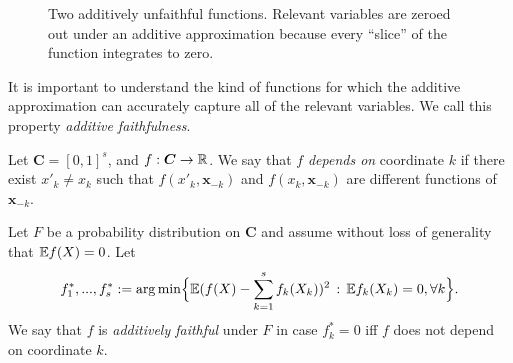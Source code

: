 \begin{figure}[htp]
\vskip-10pt
	\centering
\caption{Two additively unfaithful functions. Relevant variables are
  zeroed out under an additive approximation because every ``slice''
  of the function integrates to zero.}
\vskip-10pt
\end{figure}

It is important to understand the kind of functions for which the
additive approximation can accurately capture all of the relevant variables.
We call this property \emph{additive faithfulness}.

\begin{definition}
  Let $\mathbf{C}=[0,1]^s$, and $f:\mbox{\boldmath $C$}\rightarrow \mathbb{R}$. We say
  that $f$ \emph{depends on} coordinate $k$ if there exist $x'_k \neq
  x_k$ such that $f(x'_k, \mathbf{x}_{-k})$ and $f(x_k,
  \mathbf{x}_{-k})$ are different functions of $\mathbf{x}_{-k}$.

Let $F$ be a probability distribution on $\mathbf{C}$ and
assume without loss of generality that ${\mathbb E} f(X) = 0$. Let 
$$\displaystyle f^*_1,...,f^*_s := \arg\min \Bigl\{ {\mathbb E} ( f(X) - \sum_{k=1}^s
f_k(X_k) )^2 \,:\, {\mathbb E} f_k(X_k) = 0, \forall k\Bigr\}.$$
We say that $f$ is \emph{additively faithful} under $F$ in case $f^*_k = 0$ iff $f$ does not depend on coordinate $k$. 
\end{definition}

